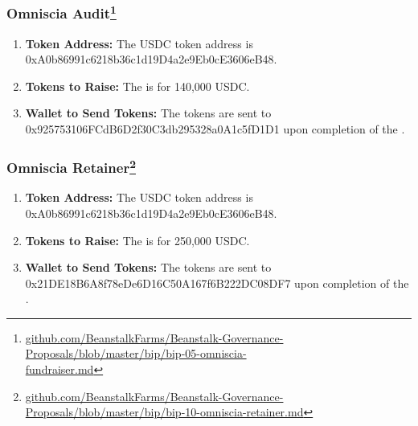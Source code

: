 \documentclass[class=article, crop=false]{standalone}
\begin{document}
\subsubsection[Omniscia Audit]{Omniscia Audit\protect \footnote{\href{https://github.com/BeanstalkFarms/Beanstalk-Governance-Proposals/blob/master/bip/bip-05-omniscia-fundraiser.md}{github.com/BeanstalkFarms/Beanstalk-Governance-Proposals/blob/master/bip/bip-05-omniscia-\\fundraiser.md}}}
    \begin{enumerate}
        \item \textbf{Token Address:} The USDC token address is 0xA0b86991c6218b36c1d19D4a2e9Eb0cE3606eB48.
        \item \textbf{Tokens to Raise:} The  is for 140,000 USDC.
        \item \textbf{Wallet to Send Tokens:} The tokens are sent to 0x925753106FCdB6D2f30C3db295328a0A1c5fD1D1 upon completion of the .
    \end{enumerate}

\subsubsection[Omniscia Retainer]{Omniscia Retainer\protect \footnote{\href{https://github.com/BeanstalkFarms/Beanstalk-Governance-Proposals/blob/master/bip/bip-10-omniscia-retainer.md}{github.com/BeanstalkFarms/Beanstalk-Governance-Proposals/blob/master/bip/bip-10-omniscia-retainer.md}}}
    \begin{enumerate}
        \item \textbf{Token Address:} The USDC token address is 0xA0b86991c6218b36c1d19D4a2e9Eb0cE3606eB48.
        \item \textbf{Tokens to Raise:} The  is for 250,000 USDC.
        \item \textbf{Wallet to Send Tokens:} The tokens are sent to 0x21DE18B6A8f78eDe6D16C50A167f6B222DC08DF7 upon completion of the .
    \end{enumerate}
\end{document}
